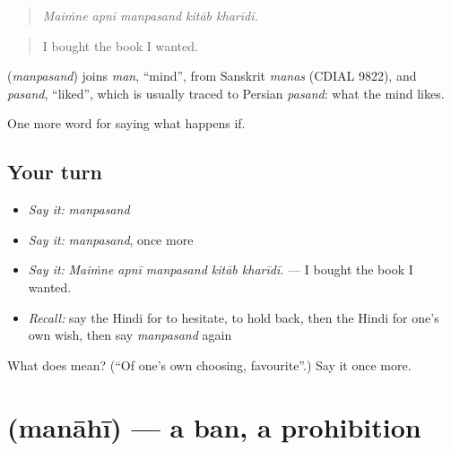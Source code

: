 \begin{quote}
    
\end{quote}

\begin{quote}
\emph{Maiṁne apnī manpasand kitāb kharīdī.}
\end{quote}

\begin{quote}
I bought the book I wanted.
\end{quote}

\begin{cousinweb}
\textbf{} (\emph{manpasand}) joins \emph{man}, \textquotedblleft{}mind\textquotedblright{}, from Sanskrit \emph{manas} (CDIAL 9822), and \emph{pasand}, \textquotedblleft{}liked\textquotedblright{}, which is usually traced to Persian \emph{pasand}: what the mind likes.
\end{cousinweb}

\begin{grammarlens}[title={What you've built}]
One more word for saying what happens if.
\end{grammarlens}

\subsection*{Your turn}
\begin{itemize}
\raggedright
  \item \emph{Say it:} \emph{manpasand}
  \item \emph{Say it:} \emph{manpasand}, once more
  \item \emph{Say it:} \emph{Maiṁne apnī manpasand kitāb kharīdī.} — I bought the book I wanted.
  \item \emph{Recall:} say the Hindi for to hesitate, to hold back, then the Hindi for one's own wish, then say \emph{manpasand} again
\end{itemize}

\begin{tcolorbox}[breakable,colback=teal!4,colframe=teal!35!black,title={Before you move on}]
What does  mean? (\textquotedblleft{}Of one's own choosing, favourite\textquotedblright{}.) Say it once more.
\end{tcolorbox}
\section[\texorpdfstring{\hi{मनाही} (manāhī)}{मनाही (manāhī)}]{ (manāhī) — a ban, a prohibition}

